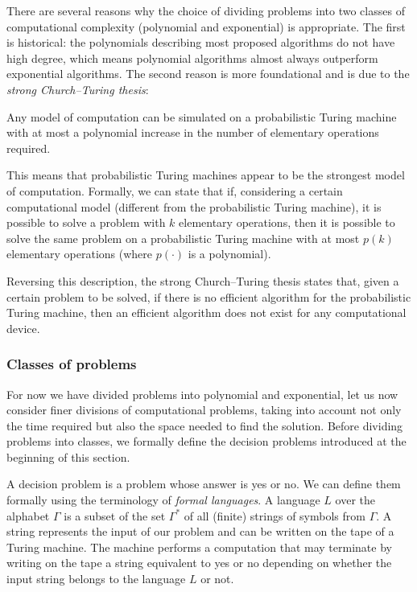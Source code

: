 There are several reasons why the choice of dividing problems into two classes of computational complexity (polynomial and exponential) is appropriate. The first is historical: the polynomials describing most proposed algorithms do not have high degree, which means polynomial algorithms almost always outperform exponential algorithms. The second reason is more foundational and is due to the \emph{strong Church–Turing thesis}:
\begin{thesis}
	Any model of computation can be simulated on a probabilistic Turing machine with at most a polynomial increase in the	number of elementary operations required.
\end{thesis}
This means that probabilistic Turing machines appear to be the strongest  model of computation. Formally, we can state that if, considering a certain computational model (different from the probabilistic Turing machine), it is possible to solve a problem with $k$ elementary operations, then it is possible to solve the same problem on a probabilistic Turing machine with at most $p(k)$ elementary operations (where $p(\cdot)$ is a polynomial).

Reversing this description, the strong Church–Turing thesis states that, given a certain problem to be solved, if there is no efficient algorithm for the probabilistic Turing machine, then an efficient algorithm does not exist for any computational device.

\subsubsection*{Classes of problems}
For now we have divided problems into polynomial and exponential, let us now consider finer divisions of computational problems, taking into account not only the time required but also the space needed to find the solution. Before dividing problems into classes, we formally define the decision problems introduced at the beginning of this section.

A decision problem is a problem whose answer is yes or no. We can define them formally using the terminology of \emph{formal languages}. A language $L$ over the alphabet $\Gamma$ is a subset of the set $\Gamma^*$ of all (finite) strings of symbols from $\Gamma$. A string represents the input of our problem and can be written on the tape of a Turing machine. The machine performs a computation that may terminate by writing on the tape a string equivalent to yes or no depending on whether the input string belongs to the language $L$ or not.

